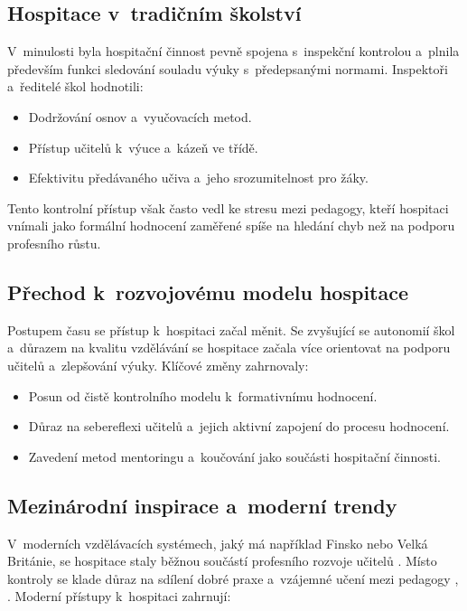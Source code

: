 \subsection{Hospitace v~tradičním školství}

V~minulosti byla hospitační činnost pevně spojena s~inspekční kontrolou a~plnila především funkci sledování souladu výuky s~předepsanými normami. Inspektoři a~ředitelé škol hodnotili:

\begin{itemize}
    \item Dodržování osnov a~vyučovacích metod.

    \item Přístup učitelů k~výuce a~kázeň ve třídě.
    
    \item Efektivitu předávaného učiva a~jeho srozumitelnost pro žáky.    
\end{itemize}

Tento kontrolní přístup však často vedl ke stresu mezi pedagogy, kteří hospitaci vnímali jako formální hodnocení zaměřené spíše na hledání chyb než na podporu profesního růstu.

\subsection{Přechod k~rozvojovému modelu hospitace}

Postupem času se přístup k~hospitaci začal měnit. Se zvyšující se autonomií škol a~důrazem na kvalitu vzdělávání se hospitace začala více orientovat na podporu učitelů a~zlepšování výuky. Klíčové změny zahrnovaly:

\begin{itemize}
    \item Posun od čistě kontrolního modelu k~formativnímu hodnocení.

    \item Důraz na sebereflexi učitelů a~jejich aktivní zapojení do procesu hodnocení.

    \item Zavedení metod mentoringu a~koučování jako součásti hospitační činnosti.
\end{itemize}

\subsection{Mezinárodní inspirace a~moderní trendy}

V~moderních vzdělávacích systémech, jaký má například Finsko nebo Velká Británie, se hospitace staly běžnou součástí profesního rozvoje učitelů \cite{autoevaluace-zahranici}. Místo kontroly se klade důraz na sdílení dobré praxe a~vzájemné učení mezi pedagogy \cite{ucime-ucit-se}, \cite{metody-a-formy}. Moderní přístupy k~hospitaci zahrnují:

